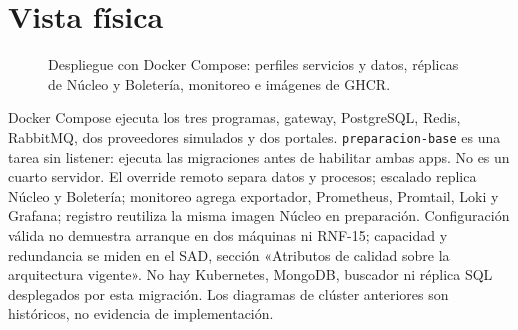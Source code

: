 \section{Vista física}
\label{sec:fisica}
\begin{figure}[H]\centering\HexDespliegue
\caption{Despliegue con Docker Compose: perfiles servicios y datos, réplicas de Núcleo y Boletería,
monitoreo e imágenes de GHCR.}\label{fig:despliegue}\end{figure}
Docker Compose ejecuta los tres programas, gateway, PostgreSQL, Redis, RabbitMQ,
dos proveedores simulados y dos portales. \texttt{preparacion-base} es una tarea
sin listener: ejecuta las migraciones antes de habilitar ambas apps. No es un cuarto
servidor. El override remoto separa datos y procesos; escalado replica Núcleo y
Boletería; monitoreo agrega exportador, Prometheus, Promtail, Loki y Grafana;
registro reutiliza la misma imagen Núcleo en preparación. Configuración válida
no demuestra arranque en dos máquinas ni RNF-15; capacidad y redundancia se
miden en el SAD, sección «Atributos de calidad sobre la arquitectura vigente».
No hay Kubernetes, MongoDB, buscador ni réplica SQL desplegados por esta migración.
Los diagramas de clúster anteriores son históricos, no evidencia de implementación.

